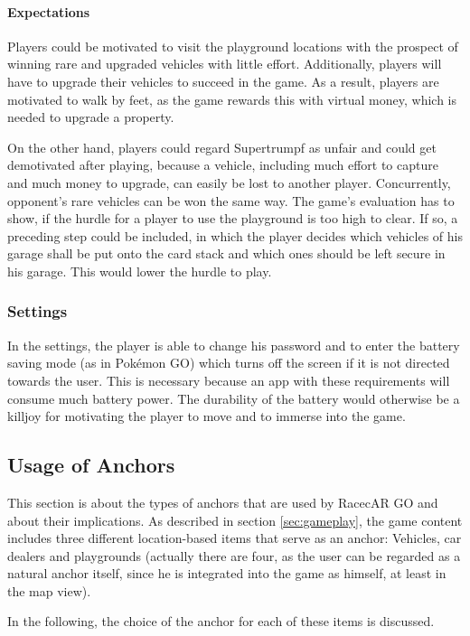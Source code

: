\paragraph{Expectations}
Players could be motivated to visit the playground locations with the prospect of winning rare and upgraded vehicles with little effort. Additionally, players will have to upgrade their vehicles to succeed in the game. As a result, players are motivated to walk by feet, as the game rewards this with virtual money, which is needed to upgrade a property.

On the other hand, players could regard Supertrumpf as unfair and could get demotivated after playing, because a vehicle, including much effort to capture and much money to upgrade, can easily be lost to another player. Concurrently, opponent's rare vehicles can be won the same way. The game's evaluation has to show, if the hurdle for a player to use the playground is too high to clear. If so, a preceding step could be included, in which the player decides which vehicles of his garage shall be put onto the card stack and which ones should be left secure in his garage. This would lower the hurdle to play.

\subsubsection{Settings}
In the settings, the player is able to change his password and to enter the battery saving mode (as in Pok\'{e}mon GO) which turns off the screen if it is not directed towards the user. This is necessary because an app with these requirements will consume much battery power. The durability of the battery would otherwise be a killjoy for motivating the player to move and to immerse into the game.

\subsection{Usage of Anchors}\label{sec:usageOfAnchors}
This section is about the types of anchors that are used by RacecAR GO and about their implications. As described in section \ref{sec:gameplay}, the game content includes three different location-based items that serve as an anchor: Vehicles, car dealers and playgrounds (actually there are four, as the user can be regarded as a natural anchor itself, since he is integrated into the game as himself, at least in the map view).

In the following, the choice of the anchor for each of these items is discussed.

